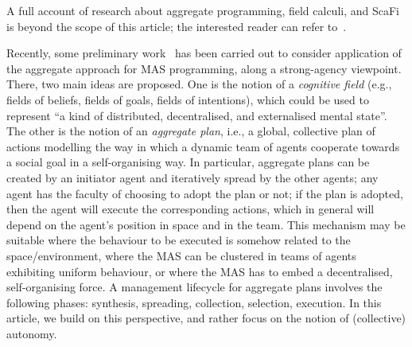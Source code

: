 %
A full account of research about aggregate programming, field calculi, and ScaFi is beyond the scope of this article; the interested reader can refer to~\cite{viroli2019jlamp-si-coord,DBLP:journals/eaai/CasadeiVAPD21}.

Recently, some preliminary work~\cite{viroli2017ijaose-aggregate-plans} has been carried out 
 to consider application of the aggregate approach 
 for MAS programming, along a strong-agency viewpoint. %
%
There, two main ideas are proposed.
%
One is the notion of a \emph{cognitive field} (e.g., fields of beliefs, fields of goals, fields of intentions),
 which could be used to represent ``a kind of distributed, decentralised, and externalised mental state''.
%
The other is the notion of an \emph{aggregate plan}, i.e., a global, collective plan of actions modelling the way in which a dynamic team of agents cooperate towards a social goal in a self-organising way.
%
In particular, aggregate plans can be created by an initiator agent
and iteratively spread by the other agents; any agent has the faculty of choosing
to adopt the plan or not; if the plan is adopted, then the agent will execute the
corresponding actions, which in general will depend on the agent’s position in
space and in the team. This mechanism may be suitable where the behaviour to
be executed is somehow related to the space/environment, where the MAS can
be clustered in teams of agents exhibiting uniform behaviour, or where the MAS
has to embed a decentralised, self-organising force. A management lifecycle for
aggregate plans involves the following phases: synthesis, spreading, collection, selection, execution.
%
In this article, we build on this perspective, and rather focus on the notion of (collective) autonomy.


